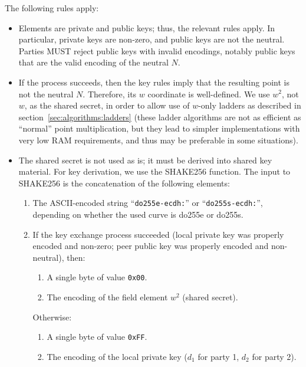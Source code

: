 \documentclass{llncs}
\begin{document}
The following rules apply:
\begin{itemize}

    \item Elements are private and public keys; thus, the relevant rules
    apply. In particular, private keys are non-zero, and public keys
    are not the neutral. Parties MUST reject public keys with invalid
    encodings, notably public keys that are the valid encoding of the
    neutral $N$.

    \item If the process succeeds, then the key rules imply that the
    resulting point is not the neutral $N$. Therefore, its $w$
    coordinate is well-defined. We use $w^2$, not $w$, as the shared
    secret, in order to allow use of $w$-only ladders as described in
    section~\ref{sec:algorithms:ladders} (these ladder algorithms are
    not as efficient as ``normal'' point multiplication, but they lead
    to simpler implementations with very low RAM requirements, and thus
    may be preferable in some situations).

    \item The shared secret is not used as is; it must be derived into
    shared key material. For key derivation, we use the
    SHAKE256\cite{Fips202} function. The input to SHAKE256 is the
    concatenation of the following elements:
    \begin{enumerate}

        \item The ASCII-encoded string ``\verb+do255e-ecdh:+''
        or ``\verb+do255s-ecdh:+'', depending on whether the used curve
        is do255e or do255s.

        \item If the key exchange process succeeded (local private key
        was properly encoded and non-zero; peer public key was properly
        encoded and non-neutral), then:
        \begin{enumerate}
            \item A single byte of value \verb+0x00+.
            \item The encoding of the field element $w^2$ (shared secret).
        \end{enumerate}
        Otherwise:
        \begin{enumerate}
            \item A single byte of value \verb+0xFF+.
            \item The encoding of the local private key ($d_1$ for party 1,
            $d_2$ for party 2).
        \end{enumerate}


\end{enumerate}
\end{itemize}
\end{document}
